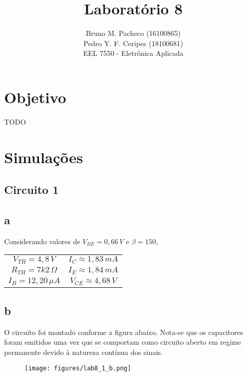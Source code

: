 \documentclass[a4paper]{report}
\begin{document}
 
\title{Laboratório 8}
\author{Bruno M. Pacheco (16100865)\\
Pedro Y. F. Ceripes (18100681) \\
EEL 7550 - Eletrônica Aplicada}

\maketitle
\section*{Objetivo}

TODO

\section*{Simulações}

\subsection*{Circuito 1}
\subsection*{a}

Considerando valores de $V_{BE} = 0,66\,V$ e $\beta = 150$,

\begin{table}[H]
    \centering
    \begin{tabular}{c c}
    $V_{TH} = 4,8\,V$ & $I_C \approx 1,83\,mA$ \\
    $R_{TH} = 7k2\,\Omega$ & $I_E \approx 1,84\, mA $ \\
    $I_B = 12,20\,\mu A$ & $V_{CE} \approx 4,68\,V$
    \end{tabular}
\end{table}

\subsection*{b}

O circuito foi montado conforme a figura abaixo. Nota-se que os capacitores foram emitidos uma vez que se comportam como circuito aberto em regime permanente devido à natureza contínua dos sinais.

\begin{figure}[H]
    \centering
    \texttt{[image: figures/lab8\_1\_b.png]}
\end{figure}
\end{document}
